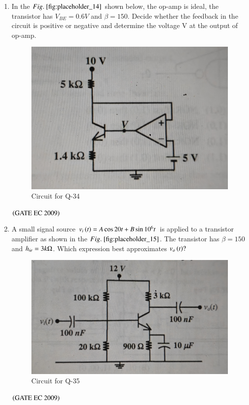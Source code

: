 \documentclass[journal,12pt,onecolumn]{IEEEtran}
\theoremstyle{remark}
\begin{document}
\begin{enumerate}
\item In the $\figref{fig:placeholder_14}$ shown below, the op-amp is ideal, the transistor has $V_{BE} = 0.6 V$ and $\beta = 150$. Decide whether the feedback in the circuit is positive or negative and determine the voltage V at the output of op-amp.     
\begin{figure}[H]
    \centering
    \includegraphics[width=0.5\columnwidth]{figs/fig_14.jpg}
    \caption{\centering Circuit for Q-34}
    \label{fig:placeholder_14}
\end{figure}
\begin{enumerate}
\end{enumerate}
\hfill $\brak{\text{GATE EC 2009}}$

\item A small signal source $v_i\brak{t} = A\cos{20t} + B \sin{10^6t}$ is applied to a transistor amplifier as shown in the $\figref{fig:placeholder_15}$. The transistor has $\beta = 150$ and $h_{ie} = 3k\ohm$. Which expression best approximates $v_o\brak{t} ?$
\begin{figure}[H]
    \centering
    \includegraphics[width=0.5\columnwidth]{figs/fig_15.jpg}
    \caption{\centering Circuit for Q-35}
    \label{fig:placeholder_15}
\end{figure}
\begin{enumerate}
\end{enumerate}
\hfill $\brak{\text{GATE EC 2009}}$


\end{enumerate}
\end{document}
